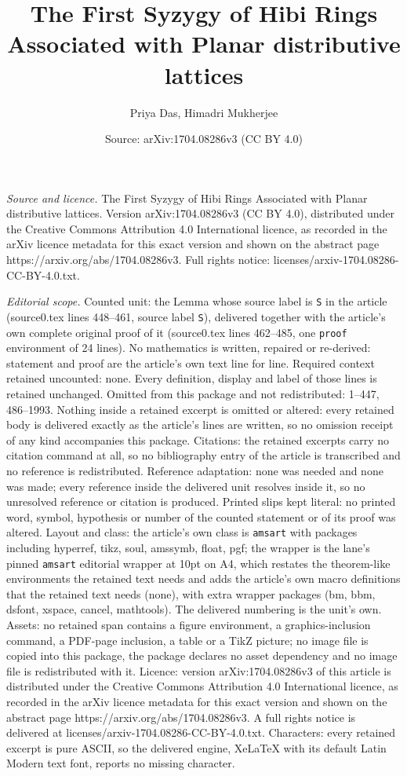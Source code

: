 \documentclass[10pt,a4paper]{amsart}
\title[The First Syzygy of Hibi Rings Associated with Planar distri]{The First Syzygy of Hibi Rings Associated with Planar distributive lattices}
\author{Priya Das, Himadri Mukherjee}
\date{Source: arXiv:1704.08286v3 (CC BY 4.0)}
\begin{document}
\maketitle

\noindent\emph{Source and licence.} The First Syzygy of Hibi Rings Associated with Planar distributive lattices. Version arXiv:1704.08286v3 (CC BY 4.0), distributed under the Creative Commons Attribution 4.0 International licence, as recorded in the arXiv licence metadata for this exact version and shown on the abstract page https://arxiv.org/abs/1704.08286v3. Full rights notice: licenses/arxiv-1704.08286-CC-BY-4.0.txt.\par\smallskip

\noindent\textit{Editorial scope.} Counted unit: the Lemma whose source label is \texttt{S} in the article (source0.tex lines 448--461, source label \texttt{S}), delivered together with the article's own complete original proof of it (source0.tex lines 462--485, one \texttt{proof} environment of 24 lines). No mathematics is written, repaired or re-derived: statement and proof are the article's own text line for line. Required context retained uncounted: none. Every definition, display and label of those lines is retained unchanged. Omitted from this package and not redistributed: 1--447, 486--1993. Nothing inside a retained excerpt is omitted or altered: every retained body is delivered exactly as the article's lines are written, so no omission receipt of any kind accompanies this package. Citations: the retained excerpts carry no citation command at all, so no bibliography entry of the article is transcribed and no reference is redistributed. Reference adaptation: none was needed and none was made; every reference inside the delivered unit resolves inside it, so no unresolved reference or citation is produced. Printed slips kept literal: no printed word, symbol, hypothesis or number of the counted statement or of its proof was altered. Layout and class: the article's own class is \texttt{amsart} with packages including hyperref, tikz, soul, amssymb, float, pgf; the wrapper is the lane's pinned \texttt{amsart} editorial wrapper at 10pt on A4, which restates the theorem-like environments the retained text needs and adds the article's own macro definitions that the retained text needs (none), with extra wrapper packages (bm, bbm, dsfont, xspace, cancel, mathtools). The delivered numbering is the unit's own. Assets: no retained span contains a figure environment, a graphics-inclusion command, a PDF-page inclusion, a table or a TikZ picture; no image file is copied into this package, the package declares no asset dependency and no image file is redistributed with it. Licence: version arXiv:1704.08286v3 of this article is distributed under the Creative Commons Attribution 4.0 International licence, as recorded in the arXiv licence metadata for this exact version and shown on the abstract page https://arxiv.org/abs/1704.08286v3. A full rights notice is delivered at licenses/arxiv-1704.08286-CC-BY-4.0.txt. Characters: every retained excerpt is pure ASCII, so the delivered engine, XeLaTeX with its default Latin Modern text font, reports no missing character.
\end{document}
